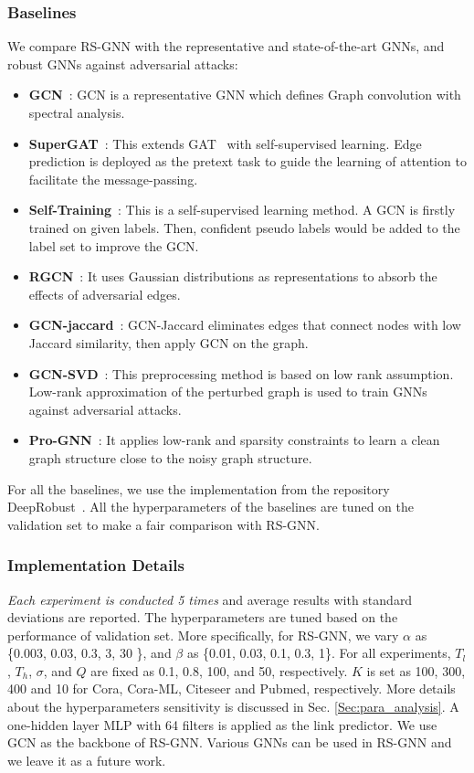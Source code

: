 \subsubsection{Baselines} We compare RS-GNN with the representative and state-of-the-art GNNs, and robust GNNs against adversarial attacks:
\begin{itemize}[leftmargin=*]
    \item \textbf{GCN}~\cite{kipf2016semi}: GCN is a representative GNN which defines Graph convolution with spectral analysis.
     \item \textbf{SuperGAT}~\cite{kim2021find}: This extends GAT~\cite{velivckovic2017graph} with self-supervised learning. Edge prediction is deployed as the pretext task to guide the learning of attention to facilitate the message-passing.
    \item \textbf{Self-Training}~\cite{li2018deeper}: This is a self-supervised learning method. A GCN is firstly trained on given labels. Then, confident pseudo labels would be added to the label set to improve the GCN.
    \item \textbf{RGCN}~\cite{zhu2019robust}: It uses Gaussian distributions as representations to absorb the effects of adversarial edges. 
    \item \textbf{GCN-jaccard}~\cite{wu2019adversarial}: GCN-Jaccard eliminates edges that connect nodes with low Jaccard similarity, then apply GCN on the graph.
    \item \textbf{GCN-SVD}~\cite{entezari2020all}: This preprocessing method is based on low rank assumption. Low-rank approximation of the perturbed graph is used to train GNNs against adversarial attacks.
    \item \textbf{Pro-GNN}~\cite{jin2020graph}: It applies low-rank and sparsity constraints to learn a clean graph structure close to the noisy graph structure. 
\end{itemize}
For all the baselines, we use the implementation from the repository DeepRobust~\cite{li2020deeprobust}. All the hyperparameters of the baselines are tuned on the validation set to make a fair comparison with RS-GNN.

\subsubsection{Implementation Details}
\label{sec:implementation}
\textit{Each experiment is conducted 5 times} and average results with standard deviations are reported. The hyperparameters are tuned based on the performance of validation set. More specifically, for RS-GNN, we vary $\alpha$ as  \{0.003, 0.03, 0.3, 3, 30 \}, and $\beta$ as \{0.01, 0.03, 0.1, 0.3, 1\}. For all experiments, $T_l$, $T_h$, $\sigma$, and $Q$ are fixed as 0.1, 0.8, 100, and 50, respectively. $K$ is set as 100, 300, 400 and 10 for Cora, Cora-ML, Citeseer and Pubmed, respectively. More details about the hyperparameters sensitivity is discussed in Sec. \ref{Sec:para_analysis}.
A one-hidden layer MLP with 64 filters is applied as the link predictor. We use GCN as the backbone of RS-GNN. Various GNNs can be used in RS-GNN and we leave it as a future work. 


